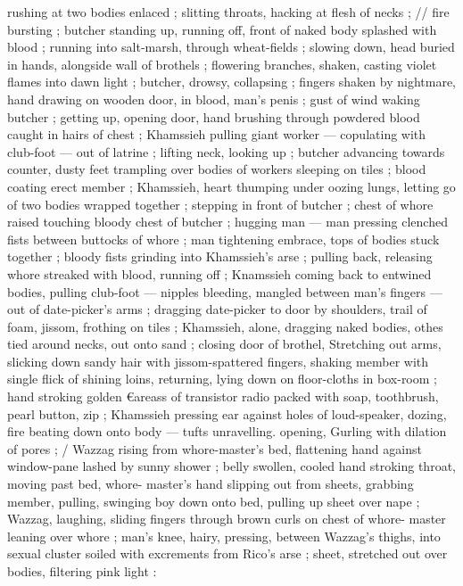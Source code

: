 rushing at two bodies enlaced ; slitting throats, hacking at flesh of 
necks ; {\slash}{\slash} fire bursting ; butcher standing up, running off, front of 
naked body splashed with blood ; running into salt-marsh, through 
wheat-fields ; slowing down, head buried in hands, alongside wall of 
brothels ; flowering branches, shaken, casting violet flames into 
dawn light ; butcher, drowsy, collapsing ; fingers shaken by 
nightmare, hand drawing on wooden door, in blood, man's penis ; 
gust of wind waking butcher ; getting up, opening door, hand 
brushing through powdered blood caught in hairs of chest ; 
Khamssieh pulling giant worker --- copulating with club-foot --- out 
of latrine ; lifting neck, looking up ; butcher advancing towards 
counter, dusty feet trampling over bodies of workers sleeping on 
tiles ; blood coating erect member ; Khamssieh, heart thumping 
under oozing lungs, letting go of two bodies wrapped together ; 
stepping in front of butcher ; chest of whore raised touching bloody 
chest of butcher ; hugging man --- man pressing clenched fists 
between buttocks of whore ; man tightening embrace, tops of bodies 
stuck together ; bloody fists grinding into Khamssieh's arse ; pulling 
back, releasing whore streaked with blood, running off ; Knamssieh 
coming back to entwined bodies, pulling club-foot --- nipples 
bleeding, mangled between man's fingers --- out of date-picker's 
arms ; dragging date-picker to door by shoulders, trail of foam, 
jissom, frothing on tiles ; Khamssieh, alone, dragging naked bodies, 
othes tied around necks, out onto sand ; closing door of brothel, 
Stretching out arms, slicking down sandy hair with jissom-spattered 
fingers, shaking member with single flick of shining loins, returning, 
lying down on floor-cloths in box-room ; hand stroking golden 
€areass of transistor radio packed with soap, toothbrush, pearl 
button, zip ; Khamssieh pressing ear against holes of loud-speaker, 
dozing, fire beating down onto body --- tufts unravelling. opening, 
Gurling with dilation of pores ; {\slash} Wazzag rising from whore-master's 
bed, flattening hand against window-pane lashed by sunny shower ; 
belly swollen, cooled hand stroking throat, moving past bed, whore- 
master's hand slipping out from sheets, grabbing member, pulling, 
swinging boy down onto bed, pulling up sheet over nape ; Wazzag, 
laughing, sliding fingers through brown curls on chest of whore- 
master leaning over whore ; man's knee, hairy, pressing, between 
Wazzag's thighs, into sexual cluster soiled with excrements from 
Rico's arse ; sheet, stretched out over bodies, filtering pink light : 
